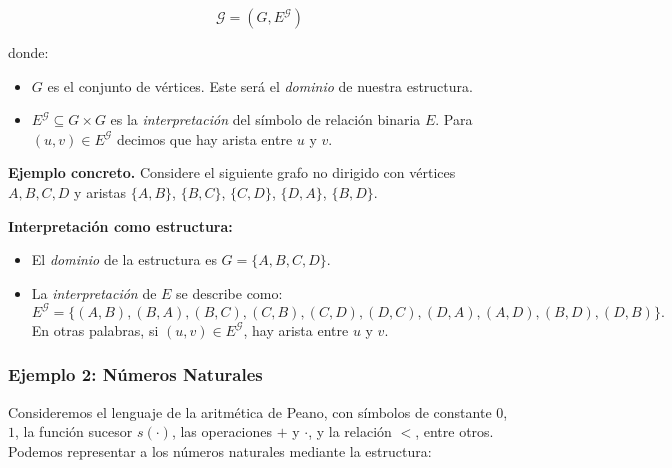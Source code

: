 \[
    \mathcal{G} = (G, E^{\mathcal{G}})
\]

donde:
\begin{itemize}
    \item $G$ es el conjunto de vértices. Este será el \emph{dominio} de nuestra estructura.
    \item $E^{\mathcal{G}} \subseteq G \times G$ es la \emph{interpretación} del símbolo de relación binaria $E$. Para $(u,v) \in E^{\mathcal{G}}$ decimos que hay arista entre $u$ y $v$.
\end{itemize}

\noindent
\textbf{Ejemplo concreto.} Considere el siguiente grafo no dirigido con vértices \(A, B, C, D\) y aristas 
$\{A,B\}$, $\{B,C\}$, $\{C,D\}$, $\{D,A\}$, $\{B,D\}$. 

\begin{center}
\end{center}

\noindent
\textbf{Interpretación como estructura:}
\begin{itemize}
    \item El \emph{dominio} de la estructura es \(G = \{A, B, C, D\}\).
    \item La \emph{interpretación} de \(E\) se describe como:
    \[
      E^{\mathcal{G}} = \{(A,B), (B,A), (B,C), (C,B), (C,D), (D,C), (D,A), (A,D), (B,D), (D,B)\}.
    \]
    En otras palabras, si \((u,v)\in E^{\mathcal{G}}\), hay arista entre \(u\) y \(v\).  
\end{itemize}


\subsubsection{Ejemplo 2: Números Naturales}
Consideremos el lenguaje de la aritmética de Peano, con símbolos de constante $0$, $1$, la función sucesor $s(\cdot)$, las operaciones $+$ y $\cdot$, y la relación $<$, entre otros. Podemos representar a los números naturales mediante la estructura:

